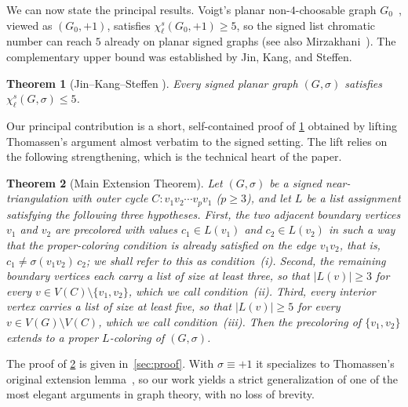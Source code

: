 \documentclass[11pt,a4paper]{article}
\theoremstyle{plain}
\newtheorem{theorem}{Theorem}[section]
\theoremstyle{definition}
\newcommand{\V}{V}
\newcommand{\chs}{\chi_{\ell}^{s}}
\newcommand{\Gs}{(G,\sigma)}
\begin{document}
We can now state the principal results. Voigt's planar
non-$4$-choosable graph $G_0$~\cite{Voigt1993}, viewed as
$(G_0,+1)$, satisfies $\chs(G_0,+1)\ge 5$, so the signed list
chromatic number can reach $5$ already on planar signed graphs (see
also Mirzakhani~\cite{Mirzakhani1996}). The complementary upper
bound was established by Jin, Kang, and Steffen.

\begin{theorem}[Jin--Kang--Steffen \cite{JinKangSteffen2016}]\label{thm:JKS}
Every signed planar graph $\Gs$ satisfies $\chs\Gs\le 5$.
\end{theorem}

Our principal contribution is a short, self-contained proof of
\cref{thm:JKS} obtained by lifting Thomassen's argument almost
verbatim to the signed setting. The lift relies on the following
strengthening, which is the technical heart of the paper.

\begin{theorem}[Main Extension Theorem]\label{thm:main}
Let $\Gs$ be a signed near-triangulation with outer cycle
$C\colon v_1v_2\cdots v_pv_1$ ($p\ge 3$), and let $L$ be a list
assignment satisfying the following three hypotheses. First, the
two adjacent boundary vertices $v_1$ and $v_2$ are precolored with
values $c_1\in L(v_1)$ and $c_2\in L(v_2)$ in such a way that the
proper-coloring condition is already satisfied on the edge $v_1v_2$,
that is, $c_1\ne\sigma(v_1v_2)\,c_2$; we shall refer to this as
condition~(i). Second, the remaining boundary vertices each carry
a list of size at least three, so that $|L(v)|\ge 3$ for every
$v\in\V(C)\setminus\{v_1,v_2\}$, which we call condition~(ii).
Third, every interior vertex carries a list of size at least five,
so that $|L(v)|\ge 5$ for every $v\in\V(G)\setminus\V(C)$, which
we call condition~(iii). Then the precoloring of $\{v_1,v_2\}$
extends to a proper $L$-coloring of $\Gs$.
\end{theorem}

The proof of \cref{thm:main} is given in~\cref{sec:proof}. With
$\sigma\equiv+1$ it specializes to Thomassen's original extension
lemma~\cite{Thomassen1994}, so our work yields a strict
generalization of one of the most elegant arguments in graph theory,
with no loss of brevity.
\end{document}
